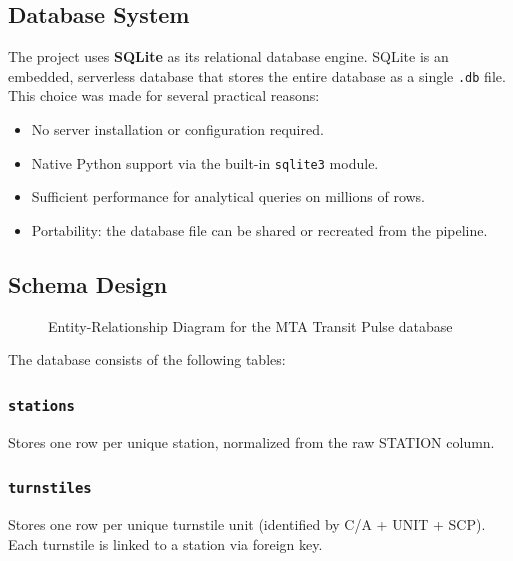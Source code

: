 
\subsection{Database System}

The project uses \textbf{SQLite} as its relational database engine. SQLite is an
embedded, serverless database that stores the entire database as a single
\texttt{.db} file. This choice was made for several practical reasons:

\begin{itemize}
    \item No server installation or configuration required.
    \item Native Python support via the built-in \texttt{sqlite3} module.
    \item Sufficient performance for analytical queries on millions of rows.
    \item Portability: the database file can be shared or recreated from the pipeline.
\end{itemize}

\subsection{Schema Design}

\begin{figure}[H]
    \centering
    \caption{Entity-Relationship Diagram for the MTA Transit Pulse database}
    \label{fig:er_diagram}
\end{figure}

The database consists of the following tables:

\subsubsection{\texttt{stations}}
Stores one row per unique station, normalized from the raw STATION column.

\subsubsection{\texttt{turnstiles}}
Stores one row per unique turnstile unit (identified by C/A + UNIT + SCP).
Each turnstile is linked to a station via foreign key.


